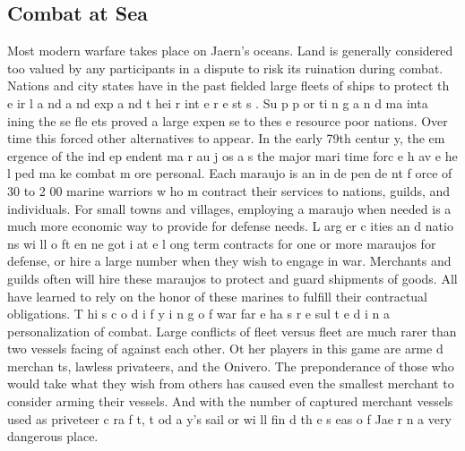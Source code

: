 \begin{multicols*}{2}
\section{Combat at Sea}
Most modern warfare takes place on Jaern’s oceans.
Land is generally considered too valued by any participants in
a dispute to risk its ruination during combat. Nations and city
states have in the past fielded large fleets of ships to protect
th e ir l a nd a nd exp a nd t hei r int e r e st s . Su p p or ti n g a n d
ma inta ining the se fle ets proved a large expen se to thes e
resource poor nations. Over time this forced other alternatives
to appear.
In the early 79th centur y, the em ergence of the
ind ep endent ma r au j os a s the major mari time forc e h av e
he l ped ma ke combat m ore personal. Each maraujo is an
in de pen de nt f orce of 30 to 2 00 marine warriors w ho m
contract their services to nations, guilds, and individuals. For
small towns and villages, employing a maraujo when needed
is a much more economic way to provide for defense needs.
L arg er c ities an d natio ns wi ll o ft en ne got i at e l ong term
contracts for one or more maraujos for defense, or hire a large
number when they wish to engage in war. Merchants and
guilds often will hire these maraujos to protect and guard 
shipments of goods. All have learned to rely on the honor of
these marines to fulfill their contractual obligations.
T hi s c o d i f y i n g o f war far e ha s r e sul t e d i n a
personalization of combat. Large conflicts of fleet versus fleet
are much rarer than two vessels facing of against each other.
Ot her players in this game are arme d merchan ts, lawless
privateers, and the Onivero. The preponderance of those who
would take what they wish from others has caused even the
smallest merchant to consider arming their vessels. And with
the number of captured merchant vessels used as priveteer
c ra f t, t od a y’s sail or wi ll fin d th e s eas o f Jae r n a very
dangerous place.

\end{multicols*}
